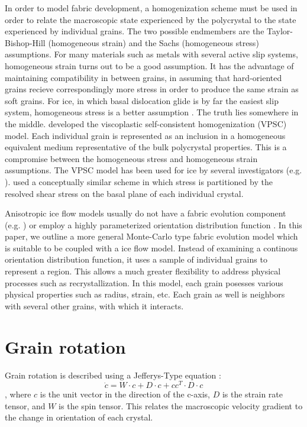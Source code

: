 \documentclass{article}
\begin{document}
In order to model fabric development, a homogenization scheme must be used in order to relate the macroscopic state experienced by the polycrystal to the state experienced by individual grains. The two possible endmembers are the Taylor-Bishop-Hill (homogeneous strain) \citep{taylor} and the Sachs (homogeneous stress) \citep{sachs} assumptions. For many materials such as metals with several active slip systems, homogeneous strain turns out to be a good assumption. It has the advantage of maintaining compatibility in between grains, in assuming that hard-oriented grains recieve correspondingly more stress in order to produce the same strain as soft grains. For ice, in which basal dislocation glide is by far the easiest slip system, homogeneous stress is a better assumption \citep{throstur2002nni}. The truth lies somewhere in the middle. \citet{molinari} developed the viscoplastic self-consistent homogenization (VPSC) model. Each individual grain is represented as an inclusion in a homogeneous equivalent medium representative of the bulk polycrystal properties. This is a compromise between the homogeneous stress and homogeneous strain assumptions. The VPSC model has been used for ice by several investigators (e.g. \citet{gillet2005}). \citet{azuma96} used a conceptually similar scheme in which stress is partitioned by the resolved shear stress on the basal plane of each individual crystal. 

Anisotropic ice flow models usually do not have a fabric evolution component (e.g. \citet{pettit2007}) or employ a highly parameterized orientation distribution function \citep{gillet2006}. In this paper, we outline a more general Monte-Carlo type fabric evolution model which is suitable to be coupled with a ice flow model. Instead of examining a continous orientation distribution function, it uses a sample of individual grains to represent a region. This allows a much greater flexibility to address physical processes such as recrystallization. In this model, each grain posesses various physical properties such as radius, strain, etc. Each grain as well is neighbors with several other grains, with which it interacts.

\section{Grain rotation}
Grain rotation is described using a Jefferys-Type equation \citep{azuma94}:
\[
 \dot{c} = W \cdot c + D \cdot c + c c^T \cdot D \cdot c
\],
where $c$ is the unit vector in the direction of the c-axis, $D$ is the strain rate tensor, and $W$ is the spin tensor. This relates the macroscopic velocity gradient to the change in orientation of each crystal. 
\end{document}
